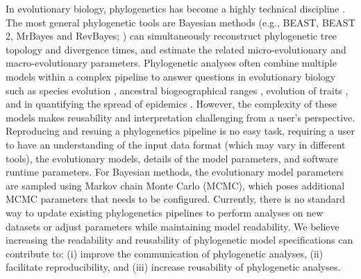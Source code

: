 \documentclass[10pt,letterpaper,table]{article}
\begin{document}
In evolutionary biology, phylogenetics has become a highly technical discipline \cite{oakley2014osiris}. 
The most general phylogenetic tools are Bayesian methods (e.g., BEAST, BEAST 2, MrBayes and
RevBayes; \cite{beast,beast2,revbayes,mrbayes}) 
can simultaneously reconstruct phylogenetic tree topology and divergence times, and estimate the related micro-evolutionary and macro-evolutionary parameters. 
Phylogenetic analyses often combine 
multiple models within a complex pipeline to answer questions in evolutionary biology such as species evolution \cite{gavryushkina17,ogilvie21,zhang21}, ancestral biogeographical ranges \cite{lemey10,landis18}, 
evolution of traits \cite{may19,bite}, and in 
quantifying the spread of epidemics \cite{faria21,douglas21}. 
However, the complexity of these models makes reusability and interpretation challenging from a user's perspective.   
Reproducing and resuing a phylogenetics pipeline is no easy task, requiring a user to have an understanding of the input data format (which may vary in different tools), the evolutionary models, details of the model parameters, and software runtime parameters. 
For Bayesian methods, the evolutionary model parameters are sampled using Markov chain Monte Carlo (MCMC), which poses additional MCMC parameters that needs to be configured. 
Currently, there is no standard way to update existing phylogenetics pipelines to perform analyses on new datasets or adjust parameters while maintaining model readability. 
We believe increasing the readability and reusability of phylogenetic model specifications can contribute to: (i) improve the communication of phylogenetic analyses, (ii) facilitate reproducibility, and (iii) increase reusability of phylogenetic analyses. 
\end{document}
